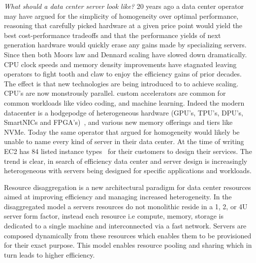 \documentclass[12pt]{ucsddissertation}
\begin{document}
\begin{dissertationintroduction}

\textit{What should a data center server look like?} 20 years ago a data center operator may have
argued for the simplicity of homogeneity over optimal performance, reasoning that carefully picked
hardware at a given price point would yield the best cost-performance tradeoffs and that the
performance yields of next generation hardware would quickly erase any gains made by specializing
servers. 
Since then both Moors law and Dennard scaling have slowed down dramatically. CPU clock speeds and
memory density improvements have stagnated leaving operators to fight tooth and claw to enjoy the
efficiency gains of prior decades. The effect is that new technologies are being introduced to to
achieve scaling.  CPU's are now monstrously parallel. custom accelerators are common for common
workloads like video coding, and machine learning. Indeed the modern datacenter is a hodgepodge of
heterogeneous hardware (GPU's, TPU's, DPU's, SmartNICs and FPGA's)~\cite{nitro}, and various new
memory offerings and tiers like NVMe. Today the same operator that argued for homogeneity would
likely be unable to name every kind of server in their data center. At the time of writing EC2 has
84 listed instance types~\cite{ec2-offer} for their customers to design their services. The trend is
clear, in search of efficiency data center and server design is increasingly heterogeneous with
servers being designed for specific applications and workloads.

Resource disaggregation is a new architectural paradigm for data center resources aimed at improving
efficiency and managing increased heterogeneity. In the disaggregated model a servers resources do
not monolithic reside in a 1, 2, or 4U server form factor, instead each resource i.e compute,
memory, storage is dedicated to a single machine and interconnected via a fast network. Servers are
composed dynamically from these resources which enables them to be provisioned for their exact
purpose. This model enables resource pooling and sharing which in turn leads to higher efficiency.



\end{dissertationintroduction}
\end{document}
